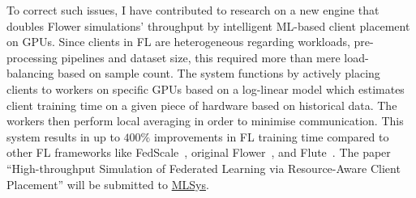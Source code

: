To correct such issues, I have contributed to research on a new engine that doubles Flower simulations' throughput by intelligent ML-based client placement on GPUs. Since clients in FL are heterogeneous regarding workloads, pre-processing pipelines and dataset size, this required more than mere load-balancing based on sample count. The system functions by actively placing clients to workers on specific GPUs based on a log-linear model which estimates client training time on a given piece of hardware based on historical data. The workers then perform local averaging in order to minimise communication. This system results in up to $400\%$ improvements in FL training time compared to other FL frameworks like FedScale~\citep{FedScale}, original Flower~\citep{Flower}, and Flute~\citep{Flute}. The paper ``High-throughput Simulation of Federated Learning via Resource-Aware Client Placement'' will be submitted to \href{https://mlsys.org/}{MLSys}.

